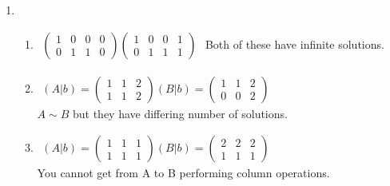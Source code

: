 \documentclass{article}
\begin{document}
\begin{enumerate}
\begin{enumerate}
\end{enumerate}

\item

\begin{enumerate}

\item 

$
\begin{array}{cc}

\left(\begin{array}{ccc|c}
1 & 0 & 0 & 0\\
0 & 1 & 1 & 0
\end{array}\right)

\left(\begin{array}{ccc|c}
1 & 0 & 0 & 1\\
0 & 1 & 1 & 1
\end{array}\right)

\end{array}
$
Both of these have infinite solutions.

\item

$
\begin{array}{cc}
(A|b) =
\left(\begin{array}{cc|c}
1 & 1 & 2\\
1 & 1 & 2
\end{array}\right)
(B|b) =
\left(\begin{array}{cc|c}
1 & 1 & 2\\
0 & 0 & 2
\end{array}\right)

\end{array}
$
\\$A \sim B$ but they have differing number of solutions.

\item

$
\begin{array}{cc}
(A|b) =
\left(\begin{array}{ccc}
1 & 1 & 1\\
1 & 1 & 1
\end{array}\right)
(B|b) =
\left(\begin{array}{ccc}
2 & 2 & 2\\
1 & 1 & 1
\end{array}\right)

\end{array}
$
\\You cannot get from A to B performing column operations.


\end{enumerate}
\end{enumerate}
\end{document}
